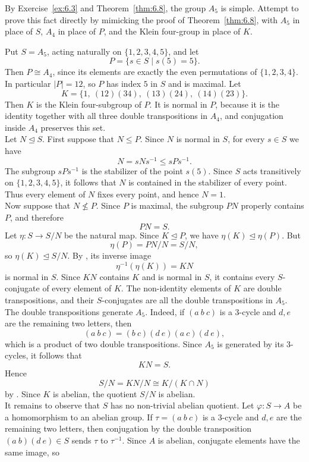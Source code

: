 \documentclass[../Odyssey_Project.tex]{subfiles}
\begin{document}
\begin{exercise}
\label{ex:6.6}
By Exercise~\ref{ex:6.3} and Theorem~\ref{thm:6.8}, the group $A_5$ is simple. Attempt to prove this fact directly by mimicking the proof of Theorem~\ref{thm:6.8}, with $A_5$ in place of $S$, $A_4$ in place of $P$, and the Klein four-group in place of $K$.
\end{exercise}
\begin{solution}
Put $S=A_5$, acting naturally on $\{1,2,3,4,5\}$, and let
\[
    P=\{s\in S\mid s(5)=5\}.
\]
Then $P\cong A_4$, since its elements are exactly the even permutations of $\{1,2,3,4\}$. In particular $|P|=12$, so $P$ has index $5$ in $S$ and is maximal. Let
\[
    K=\{1,\ (12)(34),\ (13)(24),\ (14)(23)\}.
\]
Then $K$ is the Klein four-subgroup of $P$. It is normal in $P$, because it is the identity together with all three double transpositions in $A_4$, and conjugation inside $A_4$ preserves this set.\\
Let $N\trianglelefteq S$. First suppose that $N\leq P$. Since $N$ is normal in $S$, for every $s\in S$ we have
\[
    N=sNs^{-1}\leq sPs^{-1}.
\]
The subgroup $sPs^{-1}$ is the stabilizer of the point $s(5)$. Since $S$ acts transitively on $\{1,2,3,4,5\}$, it follows that $N$ is contained in the stabilizer of every point. Thus every element of $N$ fixes every point, and hence $N=1$.\\
Now suppose that $N\nleq P$. Since $P$ is maximal, the subgroup $PN$ properly contains $P$, and therefore
\[
    PN=S.
\]
Let $\eta\colon S\to S/N$ be the natural map. Since $K\trianglelefteq P$, we have $\eta(K)\trianglelefteq\eta(P)$. But
\[
    \eta(P)=PN/N=S/N,
\]
so $\eta(K)\trianglelefteq S/N$. By , its inverse image
\[
    \eta^{-1}(\eta(K))=KN
\]
is normal in $S$. Since $KN$ contains $K$ and is normal in $S$, it contains every $S$-conjugate of every element of $K$. The non-identity elements of $K$ are double transpositions, and their $S$-conjugates are all the double transpositions in $A_5$.\\
The double transpositions generate $A_5$. Indeed, if $(a\ b\ c)$ is a $3$-cycle and $d,e$ are the remaining two letters, then
\[
    (a\ b\ c)=(b\ c)(d\ e)(a\ c)(d\ e),
\]
which is a product of two double transpositions. Since $A_5$ is generated by its $3$-cycles, it follows that
\[
    KN=S.
\]
Hence
\[
    S/N=KN/N\cong K/(K\cap N)
\]
by . Since $K$ is abelian, the quotient $S/N$ is abelian.\\
It remains to observe that $S$ has no non-trivial abelian quotient. Let $\varphi\colon S\to A$ be a homomorphism to an abelian group. If $\tau=(a\ b\ c)$ is a $3$-cycle and $d,e$ are the remaining two letters, then conjugation by the double transposition $(a\ b)(d\ e)\in S$ sends $\tau$ to $\tau^{-1}$. Since $A$ is abelian, conjugate elements have the same image, so

\end{solution}
\end{document}
